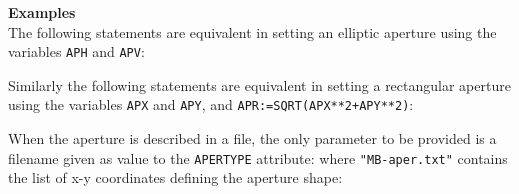 \vskip 5mm

\textbf{Examples}\\
The following statements are equivalent in setting an elliptic aperture 
using the variables \texttt{APH} and \texttt{APV}:

Similarly the following statements are equivalent in setting a rectangular 
aperture using the variables \texttt{APX} and \texttt{APY}, 
and \texttt{APR:=SQRT(APX**2+APY**2)}:

When the aperture is described in a file, the only parameter to be provided is 
a filename given as value to the \texttt{APERTYPE} attribute:
where \texttt{"MB-aper.txt"} contains the list of x-y coordinates defining the
aperture shape:

